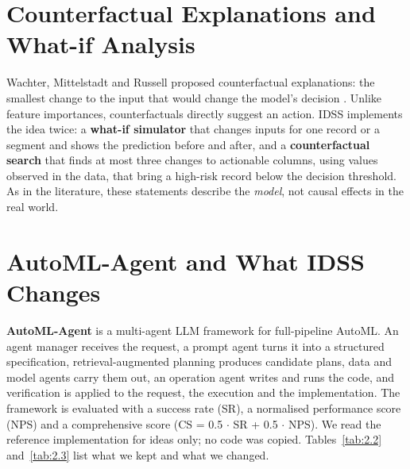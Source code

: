 \FloatBarrier
\section{Counterfactual Explanations and What-if Analysis}\label{sec:2.6}

Wachter, Mittelstadt and Russell proposed counterfactual explanations: the smallest change to the input that would change the model's decision \cite{ref11}. Unlike feature importances, counterfactuals directly suggest an action. IDSS implements the idea twice: a \textbf{what-if simulator} that changes inputs for one record or a segment and shows the prediction before and after, and a \textbf{counterfactual search} that finds at most three changes to actionable columns, using values observed in the data, that bring a high-risk record below the decision threshold. As in the literature, these statements describe the \textit{model}, not causal effects in the real world.

\FloatBarrier
\section{AutoML-Agent and What IDSS Changes}\label{sec:2.7}

\textbf{AutoML-Agent} \cite{ref9} is a multi-agent LLM framework for full-pipeline AutoML. An agent manager receives the request, a prompt agent turns it into a structured specification, retrieval-augmented planning produces candidate plans, data and model agents carry them out, an operation agent writes and runs the code, and verification is applied to the request, the execution and the implementation. The framework is evaluated with a success rate (SR), a normalised performance score (NPS) and a comprehensive score (CS = 0.5 \ensuremath{\cdot} SR + 0.5 \ensuremath{\cdot} NPS). We read the reference implementation for ideas only; no code was copied. Tables~\ref{tab:2.2} and~\ref{tab:2.3} list what we kept and what we changed.

